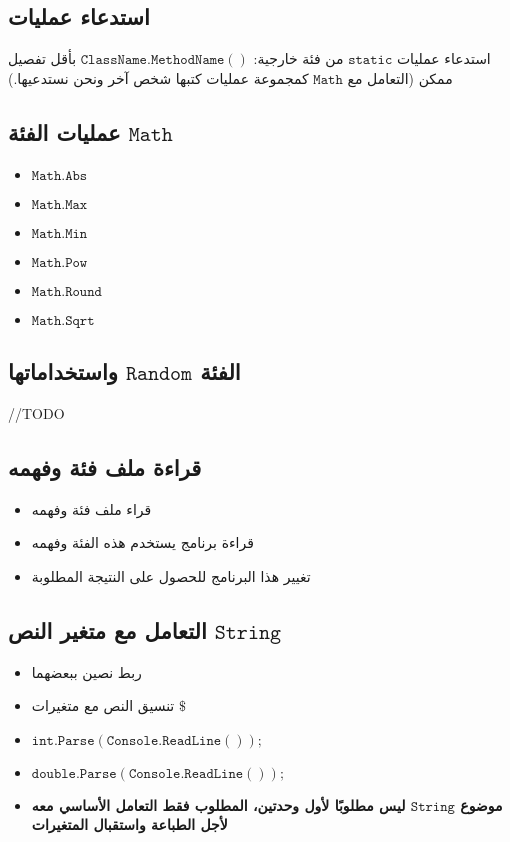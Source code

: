﻿\documentclass[12pt]{article}
\begin{document}
\subsection{استدعاء عمليات}

استدعاء عمليات $\mathtt{static}$ من فئة خارجية: $\mathtt{ClassName.MethodName()}$ بأقل تفصيل ممكن (التعامل مع $\mathtt{Math}$ كمجموعة عمليات كتبها شخص آخر ونحن نستدعيها.)

\subsection{عمليات الفئة $\mathtt{Math}$}
\begin{itemize}
    \item $\mathtt{Math.Abs}$
    \item $\mathtt{Math.Max}$
    \item $\mathtt{Math.Min}$
    \item $\mathtt{Math.Pow}$
    \item $\mathtt{Math.Round}$
    \item $\mathtt{Math.Sqrt}$
\end{itemize}

\subsection{الفئة $\mathtt{Random}$ واستخداماتها}

//TODO

\subsection{قراءة ملف فئة وفهمه}
\begin{itemize}
    \item قراء ملف فئة وفهمه
    \item قراءة برنامج يستخدم هذه الفئة وفهمه
    \item تغيير هذا البرنامج للحصول على النتيجة المطلوبة
\end{itemize}

\subsection{التعامل مع متغير النص $\mathtt{String}$}

\begin{itemize}
    \item ربط نصين ببعضهما
    \item تنسيق النص مع متغيرات $\mathtt{\$}$
    \item $\mathtt{int.Parse(Console.ReadLine());}$
    \item $\mathtt{double.Parse(Console.ReadLine());}$
    \item \textbf{موضوع $\mathtt{String}$ ليس مطلوبًا لأول وحدتين، المطلوب فقط التعامل الأساسي معه لأجل الطباعة واستقبال المتغيرات}
\end{itemize}
\end{document}
